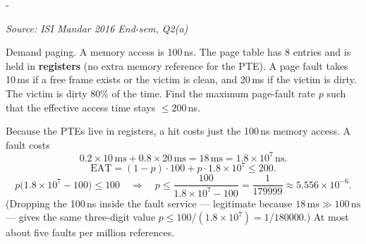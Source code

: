 \documentclass[11pt,a4paper]{article}
\makeatletter
\newcommand{\keepspace}[1]{\par\penalty-100\begingroup
  \setlength{\dimen@}{#1}\dimen@ii\pagegoal\advance\dimen@ii-\pagetotal
  \ifdim\dimen@>\dimen@ii\ifdim\dimen@ii>\z@\vfil\fi\break\fi\endgroup}
\newcounter{qn}[section]
\newenvironment{Qn}[4]{%
  \refstepcounter{qn}\keepspace{7\baselineskip}%
  \begin{tcolorbox}[qboxstyle, title={Q\thesection.\theqn\ \ [#1 \textbar\ #2]\ \ #4}]%
  {\footnotesize\color{g3}\textit{Source: #3}}\par\smallskip%
}{%
  \end{tcolorbox}%
}
\newenvironment{Sol}{%
  \begin{tcolorbox}[sboxstyle, title={Solution}]%
}{%
  \end{tcolorbox}\vspace{0.35em}%
}
\makeatother
\begin{document}
\begin{Qn}{Medium-Hard}{Lect 15}{ISI Mandar 2016 End-sem, Q2(a)}{Maximum page-fault rate for a 200\,ns EAT, with dirty writebacks}
Demand paging. A memory access is 100\,ns. The page table has 8 entries
and is held in \textbf{registers} (no extra memory reference for the
PTE). A page fault takes 10\,ms if a free frame exists or the victim is
clean, and 20\,ms if the victim is dirty. The victim is dirty 80\% of
the time. Find the maximum page-fault rate $p$ such that the effective
access time stays $\le 200$\,ns.
\end{Qn}
\begin{Sol}
Because the PTEs live in registers, a hit costs just the 100\,ns memory
access. A fault costs
\[
  0.2\times 10\,\mathrm{ms} + 0.8\times 20\,\mathrm{ms}
  = 18\,\mathrm{ms} = 1.8\times 10^{7}\,\mathrm{ns}.
\]
\[
  \mathrm{EAT}
  = (1-p)\cdot 100 + p\cdot 1.8\times 10^{7}
  \le 200.
\]
\[
  p\bigl(1.8\times 10^{7}-100\bigr) \le 100
  \quad\Rightarrow\quad
  p \le \frac{100}{1.8\times 10^{7}-100}
  = \frac{1}{179999}
  \approx 5.556\times 10^{-6}.
\]
(Dropping the 100\,ns inside the fault service --- legitimate because
$18\,\mathrm{ms}\gg 100\,\mathrm{ns}$ --- gives the same three-digit
value $p\le 100/(1.8\times 10^{7})=1/180000$.) At most about five
faults per million references.
\end{Sol}
\end{document}
